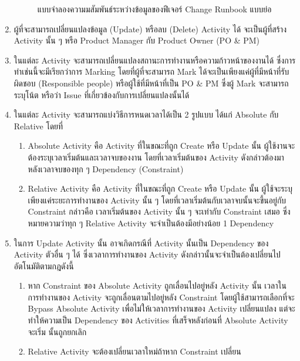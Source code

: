 \begin{enumerate}
\begin{figure}[H]
        \caption[แบบจำลองความมสัมพันธ์ระหว่างข้อมูลของฟีเจอร์ Change Runbook แบบย่อ]{แบบจำลองความมสัมพันธ์ระหว่างข้อมูลของฟีเจอร์ Change Runbook แบบย่อ}
        \label{fig:change-runbook-er}
    \end{figure}
    \item ผู้ที่จะสามารถเปลี่ยนแปลงข้อมูล (Update) หรือลบ (Delete) Activity ได้ จะเป็นผู้ที่สร้าง Activity นั้น ๆ หรือ Product Manager กับ Product Owner (PO \& PM)
    \item ในแต่ละ Activity จะสามารถเปลี่ยนแปลงสถานะการทำงานหรือความก้าวหน้าของงานได้ ซึ่งการทำเช่นนี้จะมีเรียกว่าการ Marking โดยที่ผู้ที่จะสามารถ Mark ได้จะเป็นเพียงแค่ผู้ที่มีหน้าที่รับผิดชอบ (Responsible people) หรือผู้ใช้ที่มีหน้าที่เป็น PO \& PM ซึ่งผู้ Mark จะสามารถระบุโน้ต หรือว่า Issue ที่เกี่ยวข้องกับการเปลี่ยนแปลงนั้นได้
    \item ในแต่ละ Activity จะสามารถแบ่งวิธีการหนดเวลาได้เป็น 2 รูปแบบ ได้แก่ Absolute กับ Relative โดยที่ 
    \begin{enumerate}
        \item Absolute Activity คือ Activity ที่ในขณะที่ถูก Create หรือ Update นั้น ผู้ใช้งานจะต้องระบุเวลาเริ่มต้นและเวลาจบของงาน โดยที่เวลาเริ่มต้นของ Activity ดังกล่าวต้องมาหลังเวลาจบของทุก ๆ Dependency (Constraint)
        \item Relative Activity คือ Activity ที่ในขณะที่ถูก Create หรือ Update นั้น ผู้ใช้จะระบุเพียงแค่ระยะการทำงานของ Activity นั้น ๆ โดยที่เวลาเริ่มต้นกับเวลาจบนั้นจะขึ้นอยู่กับ Constraint กล่าวคือ เวลาเริ่มต้นของ Activity นั้น ๆ จะเท่ากับ Constraint เสมอ ซึ่งหมายความว่าทุก ๆ Relative Activity จะจำเป็นต้องมีอย่างน้อย 1 Dependency
    \end{enumerate}
    \item ในการ Update Activity นั้น อาจเกิดกรณีที่ Activity นั้นเป็น Dependency ของ Activity ตัวอื่น ๆ ได้ ซึ่งเวลาการทำงานของ Activity ดังกล่าวนั้นจะจำเป็นต้องเปลี่ยนไปอัตโนมัติตามกฎดังนี้
    \begin{enumerate}
        \item หาก Constraint ของ Absolute Activity ถูกเลื่อนไปอยู่หลัง Activity นั้น เวลาในการทำงานของ Activity จะถูกเลื่อนตามไปอยู่หลัง Constraint โดยผู้ใช้สามารถเลือกที่จะ Bypass Absolute Activity เพื่อไม่ให้เวลาการทำงานของ Activity เปลี่ยนแปลง แต่จะทำให้ความเป็น Dependency ของ Activities ที่เสร็จหลังก่อนที่ Absolute Activity จะเริ่ม นั้นถูกยกเลิก 
        \item Relative Activity จะต้องเปลี่ยนเวลาใหม่ถ้าหาก Constraint เปลี่ยน
    \end{enumerate}
    \newcommand{\nabs}{$\langle \textrm{abs} \rangle$}
    \newcommand{\nrel}{$\langle \textrm{rel} \rangle$}


\end{enumerate}
